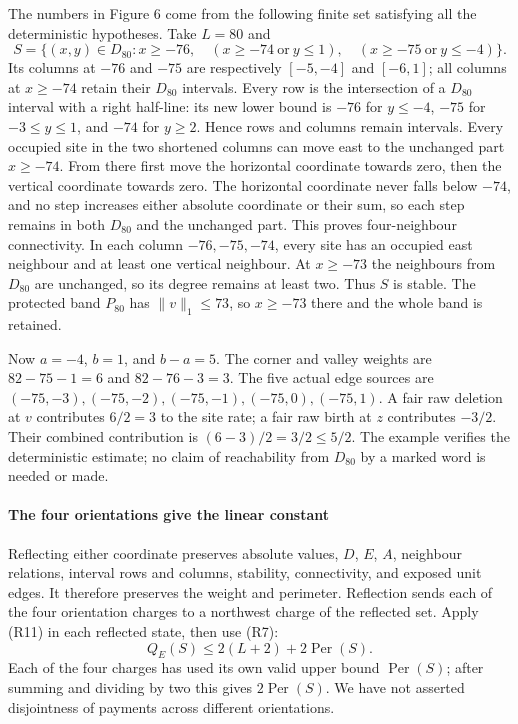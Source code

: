 \documentclass[
  11pt,
  a4paper,
]{article}
\begin{document}
The numbers in Figure 6 come from the following finite set satisfying
all the deterministic hypotheses. Take \(L=80\) and \[
S=\{(x,y)\in D_{80}:x\geq-76,\quad(x\geq-74\ \text{or}\ y\leq1),\quad
(x\geq-75\ \text{or}\ y\leq-4)\}.
\tag{R12}
\] Its columns at \(-76\) and \(-75\) are respectively \([-5,-4]\) and
\([-6,1]\); all columns at \(x\geq-74\) retain their \(D_{80}\)
intervals. Every row is the intersection of a \(D_{80}\) interval with a
right half-line: its new lower bound is \(-76\) for \(y\leq-4\), \(-75\)
for \(-3\leq y\leq1\), and \(-74\) for \(y\geq2\). Hence rows and
columns remain intervals. Every occupied site in the two shortened
columns can move east to the unchanged part \(x\geq-74\). From there
first move the horizontal coordinate towards zero, then the vertical
coordinate towards zero. The horizontal coordinate never falls below
\(-74\), and no step increases either absolute coordinate or their sum,
so each step remains in both \(D_{80}\) and the unchanged part. This
proves four-neighbour connectivity. In each column \(-76,-75,-74\),
every site has an occupied east neighbour and at least one vertical
neighbour. At \(x\geq-73\) the neighbours from \(D_{80}\) are unchanged,
so its degree remains at least two. Thus \(S\) is stable. The protected
band \(P_{80}\) has \(\|v\|_1\leq73\), so \(x\geq-73\) there and the
whole band is retained.

Now \(a=-4\), \(b=1\), and \(b-a=5\). The corner and valley weights are
\(82-75-1=6\) and \(82-76-3=3\). The five actual edge sources are
\((-75,-3),(-75,-2),(-75,-1),(-75,0),(-75,1)\). A fair raw deletion at
\(v\) contributes \(6/2=3\) to the site rate; a fair raw birth at \(z\)
contributes \(-3/2\). Their combined contribution is
\((6-3)/2=3/2\leq5/2\). The example verifies the deterministic estimate;
no claim of reachability from \(D_{80}\) by a marked word is needed or
made.

\paragraph{The four orientations give the linear
constant}\label{the-four-orientations-give-the-linear-constant}

Reflecting either coordinate preserves absolute values, \(D\), \(E\),
\(A\), neighbour relations, interval rows and columns, stability,
connectivity, and exposed unit edges. It therefore preserves the weight
and perimeter. Reflection sends each of the four orientation charges to
a northwest charge of the reflected set. Apply (R11) in each reflected
state, then use (R7): \[
Q_E(S)\leq2(L+2)+2\operatorname{Per}(S).
\tag{R13}
\] Each of the four charges has used its own valid upper bound
\(\operatorname{Per}(S)\); after summing and dividing by two this gives
\(2\operatorname{Per}(S)\). We have not asserted disjointness of
payments across different orientations.
\end{document}
